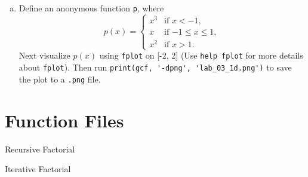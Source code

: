 \begin{enumerate}[(a)]
  \item Define an anonymous function \verb|p|, where
    \begin{equation*}
      p(x) = \begin{cases}
        x^3 & \text{if $x < -1$}, \\
        x & \text{if $-1 \leq x \leq 1$}, \\
        x^2 & \text{if $x > 1$}.
      \end{cases}
    \end{equation*}
    Next visualize $p(x)$ using \verb|fplot| on [-2, 2] (Use \verb|help fplot| for more details about \verb|fplot|). Then run \verb|print(gcf, '-dpng', 'lab_03_1d.png')| to save the plot to a \verb|.png| file.
\end{enumerate}

\section{Function Files}
\begin{minipage}[t]{0.50\linewidth}
\begin{algorithm}[H]
    \label{alg:recursive}
    \caption{Recursive Factorial}
    \SetCommentSty{\color{gray}}
    \SetAlgoLined
    \LinesNumbered
\end{algorithm}
\end{minipage}
\hfill
\begin{minipage}[t]{0.48\linewidth}
\begin{algorithm}[H]
    \label{alg:iterative}
    \caption{Iterative Factorial}
    \SetCommentSty{\color{gray}}
    \SetAlgoLined
    \LinesNumbered
\end{algorithm}
\end{minipage}

